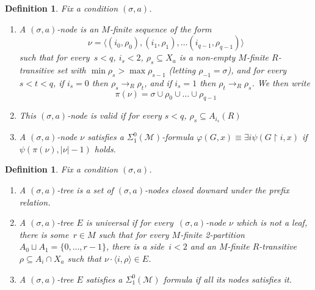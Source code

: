 \documentclass{article}
\numberwithin{theorem}{section}
\newtheorem{lemma}[theorem]{Lemma}
\newtheorem{definition}[theorem]{Definition}
\newcommand{\M}{\mathcal{M}}
\newcommand{\uh}[0]{{\upharpoonright}}
\begin{document}
\begin{definition}
Fix a condition $(\sigma, a)$.
\begin{enumerate}
    \item[(1)] A \emph{$(\sigma, a)$-node} is an $M$-finite sequence of the form
$$\nu = \langle (i_0, \rho_0), (i_1, \rho_1), \dots (i_{q-1}, \rho_{q-1}) \rangle$$ such that for every~$s < q$, $i_s < 2$, $\rho_s \subseteq X_a$ is a non-empty $M$-finite $R$-transitive set with $\min \rho_s > \max \rho_{s-1}$ (letting $\rho_{-1} = \sigma$), and for every~$s < t < q$, if $i_s = 0$ then $\rho_s \to_R \rho_t$, and if $i_s = 1$ then $\rho_t \to_R \rho_s$.
We then write $$\pi(\nu) = \sigma \cup \rho_0 \cup \dots \cup \rho_{q-1}$$
    \item[(2)] This $(\sigma, a)$-node is \emph{valid} if for every $s < q$, $\rho_s \subseteq A_{i_s}(R)$
    \item[(3)] A $(\sigma, a)$-node $\nu$ \emph{satisfies} a $\Sigma^0_1(\M)$-formula $\varphi(G, x) \equiv \exists i \psi(G \uh i, x)$  if $\psi(\pi(\nu), |\nu|-1)$ holds.
\end{enumerate}
\end{definition}


\begin{definition}
Fix a condition $(\sigma, a)$.
\begin{enumerate}
    \item[(1)] A \emph{$(\sigma, a)$-tree} is a set of $(\sigma, a)$-nodes closed downard under the prefix relation.
    \item[(2)] A $(\sigma, a)$-tree $E$ is \emph{universal} if for every~$(\sigma,a)$-node $\nu$
    which is not a leaf, there is some~$r \in M$ such that for every $M$-finite 2-partition $A_0 \sqcup A_1 = \{0, \dots, r-1\}$, there is a side~$i < 2$ and an $M$-finite $R$-transitive $\rho \subseteq A_i \cap X_a$ such that $\nu \cdot \langle i, \rho \rangle \in E$.
    \item[(3)] A $(\sigma, a)$-tree $E$ satisfies a $\Sigma^0_1(\M)$ formula if all its nodes satisfies it.
\end{enumerate}
\end{definition}
\end{document}
